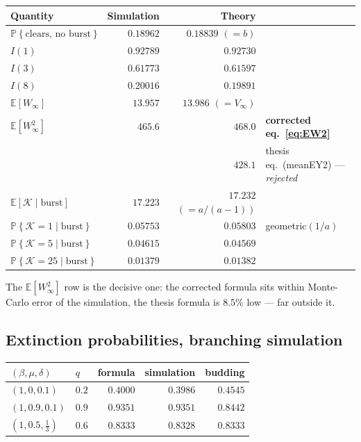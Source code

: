 \documentclass[11pt]{article}
\newcommand{\E}{\mathbb{E}}
\newcommand{\Prob}[1]{\mathbb{P}\!\left\{#1\right\}}
\newcommand{\Kb}{\mathcal{K}}
\theoremstyle{plain}
\theoremstyle{definition}
\theoremstyle{remark}
\begin{document}
\begin{center}
\renewcommand{\arraystretch}{1.3}
\begin{tabular}{@{}lrrl@{}}
\toprule
Quantity & Simulation & Theory & \\
\midrule
$\Prob{\text{clears, no burst}}$ & $0.18962$ & $0.18839$ $(=b)$ & \\
$I(1)$ & $0.92789$ & $0.92730$ & \\
$I(3)$ & $0.61773$ & $0.61597$ & \\
$I(8)$ & $0.20016$ & $0.19891$ & \\
$\E[W_\infty]$ & $13.957$ & $13.986$ $(=V_\infty)$ & \\
$\E[W_\infty^2]$ & $\mathbf{465.6}$ & $\mathbf{468.0}$ & \textbf{corrected
eq.~\eqref{eq:EW2}} \\
 & & $428.1$ & thesis eq.~(meanEY2) --- \emph{rejected} \\
$\E[\Kb\mid\text{burst}]$ & $17.223$ & $17.232$ $(=a/(a-1))$ & \\
$\Prob{\Kb=1\mid\text{burst}}$ & $0.05753$ & $0.05803$ & geometric$(1/a)$ \\
$\Prob{\Kb=5\mid\text{burst}}$ & $0.04615$ & $0.04569$ & \\
$\Prob{\Kb=25\mid\text{burst}}$ & $0.01379$ & $0.01382$ & \\
\bottomrule
\end{tabular}
\end{center}

The $\E[W_\infty^2]$ row is the decisive one: the corrected formula sits within
Monte-Carlo error of the simulation, the thesis formula is $8.5\%$ low --- far outside it.

\subsection*{Extinction probabilities, branching simulation}

\begin{center}
\renewcommand{\arraystretch}{1.3}
\begin{tabular}{@{}llrrr@{}}
\toprule
$(\beta,\mu,\delta)$ & $q$ & formula & simulation & budding \\
\midrule
$(1,0,0.1)$ & $0.2$ & $0.4000$ & $0.3986$ & $0.4545$ \\
$(1,0.9,0.1)$ & $0.9$ & $0.9351$ & $0.9351$ & $0.8442$ \\
$(1,0.5,\tfrac13)$ & $0.6$ & $0.8333$ & $0.8328$ & $0.8333$ \\
\bottomrule
\end{tabular}
\end{center}
\end{document}

